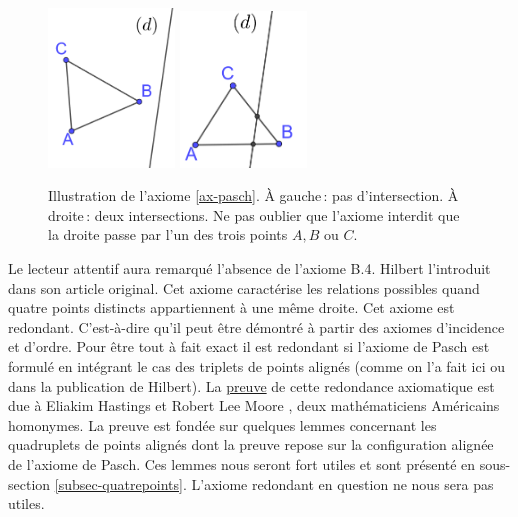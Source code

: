 \begin{figure}[h!]
    \centering
    \includegraphics[width=0.3\textwidth]{image/axiome_pasch1.png}\hfill
    \includegraphics[width=0.3\textwidth]{image/axiome_pasch2.png}
    \caption{Illustration de l'axiome \ref{ax-pasch}. À gauche\,: pas d'intersection. À droite\,: deux intersections. Ne pas oublier que l'axiome interdit que la droite passe par l'un des trois points $A,B$ ou $C$.}
    \label{fig_pasch}
\end{figure}
Le lecteur attentif aura remarqué l'absence de l'axiome B.4. Hilbert l'introduit dans son article original. Cet axiome caractérise les relations  possibles quand quatre points distincts appartiennent à une même droite. Cet axiome est redondant. C'est-à-dire qu'il peut être démontré à partir des axiomes d'incidence et d'ordre. Pour être tout à fait exact il est redondant si l'axiome de Pasch est formulé en intégrant le cas des triplets de points alignés (comme on l'a fait ici ou dans la publication de Hilbert). La \href{https://www.ams.org/journals/tran/1902-003-01/S0002-9947-1902-1500592-8/S0002-9947-1902-1500592-8.pdf}{preuve} de cette redondance axiomatique est due à Eliakim Hastings et Robert Lee Moore \cite{moore1902projective}, deux mathématiciens Américains homonymes. La preuve est fondée sur quelques lemmes concernant les quadruplets de points alignés dont la preuve repose sur la configuration alignée de l'axiome de Pasch. Ces lemmes nous seront fort utiles et sont présenté en sous-section \ref{subsec-quatrepoints}. L'axiome redondant en question ne nous sera pas utiles. %

